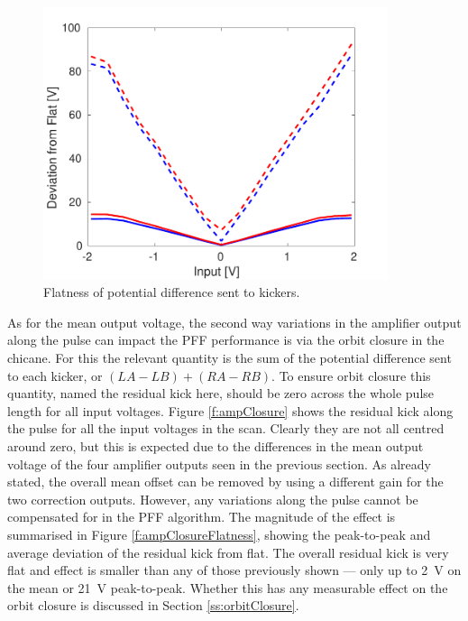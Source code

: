 \begin{figure}
  \centering
  \includegraphics[width=0.9\textwidth]{Figures/commissioning/AmpFlatness}
  \caption{Flatness of potential difference sent to kickers.}
  \label{f:ampFlatness}
\end{figure}

As for the mean output voltage, the second way variations in the amplifier output along the pulse can impact the PFF performance is via the orbit closure in the chicane. For this the relevant quantity is the sum of the potential difference sent to each kicker, or \((LA-LB)+(RA-RB)\). To ensure orbit closure this quantity, named the residual kick here, should be zero across the whole pulse length for all input voltages. Figure \ref{f:ampClosure} shows the residual kick along the pulse for all the input voltages in the scan. Clearly they are not all centred around zero, but this is expected due to the differences in the mean output voltage of the four amplifier outputs seen in the previous section. As already stated, the overall mean offset can be removed by using a different gain for the two correction outputs. However, any variations along the pulse cannot be compensated for in the PFF algorithm. The magnitude of the effect is summarised in Figure \ref{f:ampClosureFlatness}, showing the peak-to-peak and average deviation of the residual kick from flat. The overall residual kick is very flat and effect is smaller than any of those previously shown --- only up to 2~V on the mean or 21~V peak-to-peak. Whether this has any measurable effect on the orbit closure is discussed in Section \ref{ss:orbitClosure}.

